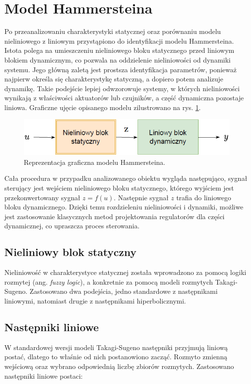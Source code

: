 \section{Model Hammersteina}
Po przeanalizowaniu charakterystyki statycznej oraz porównaniu modelu nieliniowego z liniowym przystąpiono do identyfikacji modelu Hammersteina.
Istota polega na umieszczeniu nieliniowego bloku statycznego przed liniowym blokiem dynamicznym, co pozwala na oddzielenie nieliniowości od dynamiki systemu. Jego główną zaletą jest prostsza identyfikacja parametrów, ponieważ najpierw określa się charakterystykę statyczną, a dopiero potem analizuje dynamikę. Takie podejście lepiej odwzorowuje systemy, w których nieliniowości wynikają z właściwości aktuatorów lub czujników, a część dynamiczna pozostaje liniowa. Graficzne ujęcie opisanego modelu zilustrowano na rys. \ref{hamm_model}.

\begin{figure}[h!]
\centering
\includegraphics[width=\textwidth]{pictures/hamm_model}
\caption{Reprezentacja graficzna modelu Hammersteina.}
\label{hamm_model}
\end{figure}

\noindent Cała procedura w przypadku analizowanego obiektu wygląda następująco, sygnał sterujący jest wejściem nieliniowego bloku statycznego, którego wyjściem jest przekonwertowany sygnał $z = f(u)$. Następnie sygnał $z$ trafia do liniowego bloku dynamicznego. Dzięki temu rozdzieleniu nieliniowości i dynamiki, możliwe jest zastosowanie klasycznych metod projektowania regulatorów dla części dynamicznej, co upraszcza proces sterowania.

\subsection{Nieliniowy blok statyczny}
Nieliniowość w charakterystyce statycznej została wprowadzono za pomocą logiki rozmytej (ang. \textit{fuzzy logic}), a konkretnie za pomocą modeli rozmytych Takagi-Sugeno. Zastosowano dwa podejścia, jedno standardowe z następnikami liniowymi, natomiast drugie z następnikami hiperbolicznymi.

\subsection{Następniki liniowe}
W standardowej wersji modeli Takagi-Sugeno następniki przyjmują liniową postać, dlatego to właśnie od nich postanowiono zacząć. Rozmyto zmienną wejściową oraz wybrano odpowiednią liczbę zbiorów rozmytych. Zastosowano następniki liniowe postaci:

